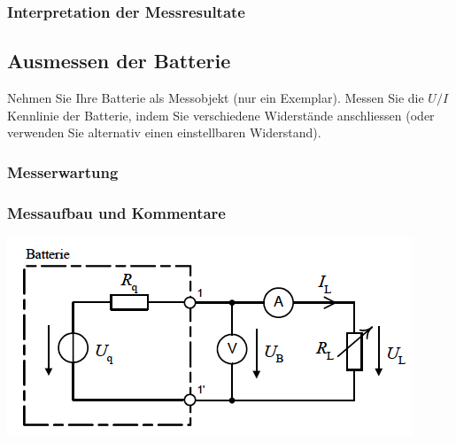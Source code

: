 \subsubsection{Interpretation der Messresultate}
\subsection{Ausmessen der Batterie}
Nehmen Sie Ihre Batterie als Messobjekt (nur ein Exemplar).
Messen Sie die $U/I$ Kennlinie der Batterie, indem Sie verschiedene
Widerstände anschliessen (oder verwenden Sie alternativ einen einstellbaren Widerstand).
\subsubsection{Messerwartung}
\subsubsection{Messaufbau und Kommentare}
\includegraphics[scale=1]{../img/III/IIIg}
